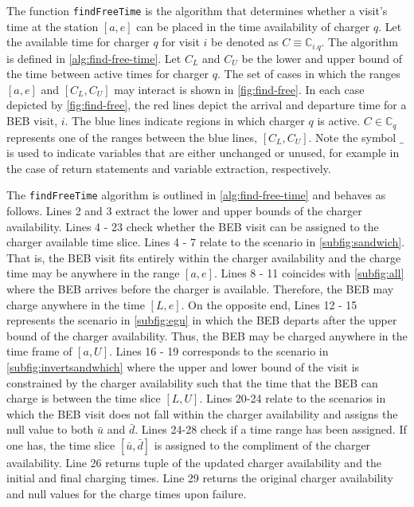 \documentclass[11pt,a4paper,final]{article}
\newcommand{\C}{\mathbb{C}}                 %
\begin{document}
The function \texttt{findFreeTime} is the algorithm that determines whether a visit's time at the station \([a, e]\) can be placed
in the time availability of charger \(q\). Let the available time for charger \(q\) for visit \(i\) be denoted as \(C \equiv
\C_{i.q}\). The algorithm is defined in \ref{alg:find-free-time}. Let \(C_L\) and \(C_U\) be the lower and upper bound of the
time between active times for charger \(q\). The set of cases in which the ranges \([a, e]\) and \([C_L, C_U]\) may interact
is shown in \ref{fig:find-free}. In each case depicted by \ref{fig:find-free}, the red lines depict the arrival and departure time
for a BEB visit, \(i\). The blue lines indicate regions in which charger \(q\) is active. \(C \in \C_q\) represents one of the
ranges between the blue lines, \([C_L, C_U]\). Note the symbol \(\_\) is used to indicate variables that are either
unchanged or unused, for example in the case of return statements and variable extraction, respectively.

The \texttt{findFreeTime} algorithm is outlined in \ref{alg:find-free-time} and behaves as follows. Lines 2 and 3 extract the
lower and upper bounds of the charger availability. Lines 4 - 23 check whether the BEB visit can be assigned to the
charger available time slice. Lines 4 - 7 relate to the scenario in \ref{subfig:sandwich}. That is, the BEB visit fits
entirely within the charger availability and the charge time may be anywhere in the range \([a, e]\). Lines 8 - 11
coincides with \ref{subfig:all} where the BEB arrives before the charger is available. Therefore, the BEB may charge
anywhere in the time \([L, e]\). On the opposite end, Lines 12 - 15 represents the scenario in \ref{subfig:egu} in which
the BEB departs after the upper bound of the charger availability. Thus, the BEB may be charged anywhere in the time
frame of \([a, U]\). Lines 16 - 19 corresponds to the scenario in \ref{subfig:invertsandwhich} where the upper and lower
bound of the visit is constrained by the charger availability such that the time that the BEB can charge is between the
time slice \([L,U]\). Lines 20-24 relate to the scenarios in which the BEB visit does not fall within the charger
availability and assigns the null value to both \(\bar{u}\) and \(\bar{d}\). Lines 24-28 check if a time range has been
assigned. If one has, the time slice \([\bar{u}, \bar{d}]\) is assigned to the compliment of the charger availability.
Line 26 returns tuple of the updated charger availability and the initial and final charging times. Line 29 returns the
original charger availability and null values for the charge times upon failure.
\end{document}
